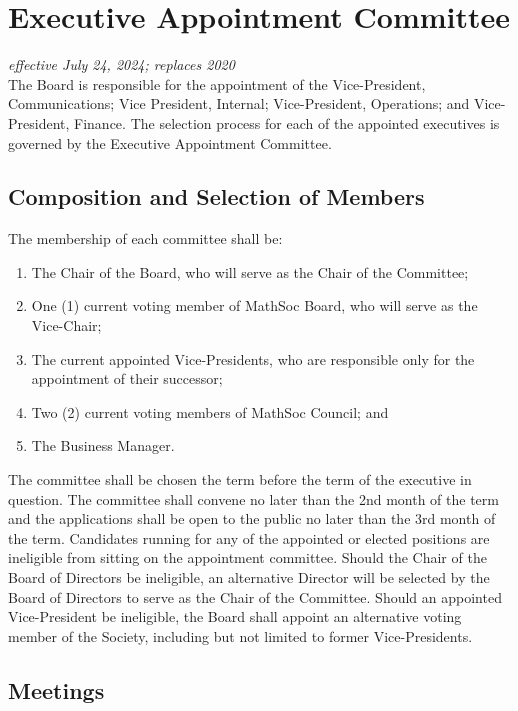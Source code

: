 \section{Executive Appointment Committee}
\emph{effective July 24, 2024; replaces 2020}\\

The Board is responsible for the appointment of the Vice-President, Communications; Vice President, Internal; Vice-President, Operations; and Vice-President, Finance.
The selection process for each of the appointed executives is governed by the Executive Appointment Committee.

\subsection{Composition and Selection of Members}

The membership of each committee shall be:
\begin{enumerate}
	\item The Chair of the Board, who will serve as the Chair of the Committee;
	\item One (1) current voting member of MathSoc Board, who will serve as the Vice-Chair;
	\item The current appointed Vice-Presidents, who are responsible only for the appointment of their successor;
	\item Two (2) current voting members of MathSoc Council; and
	\item The Business Manager.
\end{enumerate}

The committee shall be chosen the term before the term of the executive in question.
The committee shall convene no later than the 2nd month of the term and the applications shall be open to the public no later than the 3rd month of the term.
Candidates running for any of the appointed or elected positions are ineligible from sitting on the appointment committee.
Should the Chair of the Board of Directors be ineligible, an alternative Director will be selected by the Board of Directors to serve as the Chair of the Committee.
Should an appointed Vice-President be ineligible, the Board shall appoint an alternative voting member of the Society, including but not limited to former Vice-Presidents.

\subsection{Meetings}

